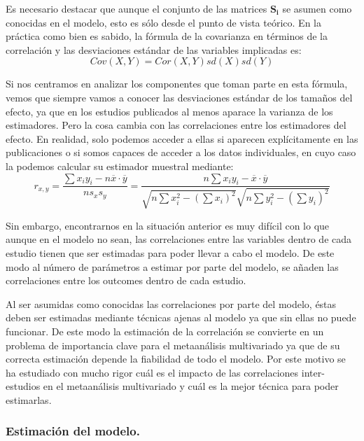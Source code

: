 \documentclass[a4paper,openright,12pt]{report}
\begin{document}
Es necesario destacar que aunque el conjunto de las matrices $\mathbf{S_{i}}$ se asumen como conocidas en el modelo, esto es sólo desde el punto de vista teórico. En la práctica como bien es sabido, la fórmula de la covarianza en términos de la correlación y las desviaciones estándar de las variables implicadas es:
\begin{equation}
Cov\left(X,Y\right) = Cor\left(X,Y\right)sd\left(X\right)sd\left(Y\right)
\label{formula_cov}
\end{equation}

Si nos centramos en analizar los componentes que toman parte en esta fórmula, vemos que siempre vamos a conocer las desviaciones estándar de los tamaños del efecto, ya que en los estudios publicados al menos aparace la varianza de los estimadores. Pero la cosa cambia con las correlaciones entre los estimadores del efecto. En realidad, solo podemos acceder a ellas si aparecen explícitamente en las publicaciones o si somos capaces de acceder a los datos individuales, en cuyo caso la podemos calcular su estimador muestral mediante:
\begin{equation}
r_{x,y}= \frac{\sum{x_{i}y_{i}}-n\overline{x}\cdot\overline{y}}{ns_{x}s_{y}}=\frac{n\sum{x_{i}y_{i}}-\overline{x}\cdot\overline{y}}{\sqrt{n\sum x_{i}^{2}-\left(\sum x_{i}\right)^2}\sqrt{n\sum y_{i}^{2}-\left(\sum y_{i}\right)^2}}
\label{formula_corr}
\end{equation}

Sin embargo, encontrarnos en la situación anterior es muy difícil con lo que aunque en el modelo no sean, las correlaciones entre las variables dentro de cada estudio tienen que ser estimadas para poder llevar a cabo el modelo. De este modo al número de parámetros a estimar por parte del modelo, se añaden las correlaciones entre los outcomes dentro de cada estudio.

Al ser asumidas como conocidas las correlaciones por parte del modelo, éstas deben ser estimadas mediante técnicas ajenas al modelo ya que sin ellas no puede funcionar. De este modo la estimación de la correlación se convierte en un problema de importancia clave para el metaanálisis multivariado ya que de su correcta estimación depende la fiabilidad de todo el modelo. Por este motivo se ha estudiado con mucho rigor cuál es el impacto de las correlaciones inter-estudios en el metaanálisis multivariado y cuál es la mejor técnica para poder estimarlas.

\subsubsection{Estimación del modelo.}
\end{document}
